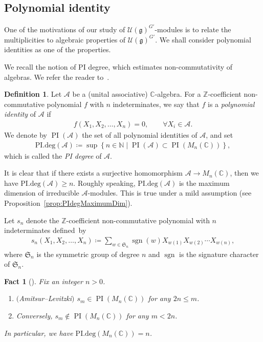 \documentclass[pdftex]{sigma}
\numberwithin{equation}{section}
\newtheorem{Fact}[Theorem]{Fact}
\theoremstyle{definition}
\newtheorem{Definition}[Theorem]{Definition}
\newcommand{\set}[1]{\left\{#1 \right\}}
\newcommand{\BasicRing}[1]{\mathbb{#1}}
\newcommand{\ZZ}{\BasicRing{Z}}
\newcommand{\NN}{\BasicRing{N}}
\newcommand{\CC}{\BasicRing{C}}
\newcommand{\PIdeg}{\mathrm{PI.deg}}
\newcommand{\alg}[1]{\mathcal{#1}}
\newcommand{\lieC}[1]{\mathfrak{#1}}
\newcommand{\univ}[1]{\mathcal{U}(\lieC{#1})}
\newcommand{\Sn}{\mathfrak{S}}
\DeclareMathOperator{\PI}{PI}
\DeclareMathOperator{\sgn}{sgn}
\begin{document}
\subsection{Polynomial identity}

One of the motivations of our study of $\univ{g}^{G'}$-modules is to relate the multiplicities to algebraic properties of $\univ{g}^{G'}$.
We shall consider polynomial identities as one of the properties.

We recall the notion of PI degree, which estimates non-commutativity of algebras.
We refer the reader to~\cite[Section~13]{McRo01_noncommutative}.

\begin{Definition}%
	Let $\alg{A}$ be a (unital associative) $\CC$-algebra.
	For a $\ZZ$-coefficient non-commutative polynomial $f$ with $n$ indeterminates, we say that $f$ is a \emph{polynomial identity} of $\alg{A}$ if
	\begin{align*}
		f(X_1, X_2, \ldots, X_n) = 0, \qquad \forall X_i \in \alg{A}.
	\end{align*}
	We denote by $\PI(\alg{A})$ the set of all polynomial identities of $\alg{A}$, and set
	\begin{align*}
		\PIdeg(\alg{A}) \coloneq \sup\set{n \in \NN \mid \PI(\alg{A})\subset \PI(M_n(\CC))},
	\end{align*}
	which is called the \emph{PI degree} of $\alg{A}$.
\end{Definition}

It is clear that if there exists a surjective homomorphism $\alg{A}\rightarrow M_n(\CC)$, then we have $\PIdeg(\alg{A}) \geq n$.
Roughly speaking, $\PIdeg(\alg{A})$ is the maximum dimension of irreducible $\alg{A}$-modules.
This is true under a mild assumption (see Proposition~\ref{prop:PIdegMaximumDim}).

Let $s_n$ denote the $\ZZ$-coefficient non-commutative polynomial with $n$ indeterminates defined~by
\begin{align*}
	s_n(X_1, X_2, \ldots, X_n) \coloneq \sum_{w \in \Sn_n} \sgn(w)X_{w(1)}X_{w(2)}\cdots X_{w(n)},
\end{align*}
where $\Sn_n$ is the symmetric group of degree $n$ and $\sgn$ is the signature character of $\Sn_n$.

\begin{Fact}[{\cite[Proposition~3.2 and Theorem~3.3]{McRo01_noncommutative}}]%
	Fix an integer $n > 0$.
	\begin{enumerate}
		\item[$1.$] $($Amitsur--Levitzki$)$ $s_m \in \PI(M_n(\CC))$ for any $2n\leq m$.
		\item[$2.$] Conversely, $s_m \not\in \PI(M_n(\CC))$ for any $m < 2n$.
	\end{enumerate}
	In particular, we have $\PIdeg(M_n(\CC)) = n$.
\end{Fact}
\end{document}
